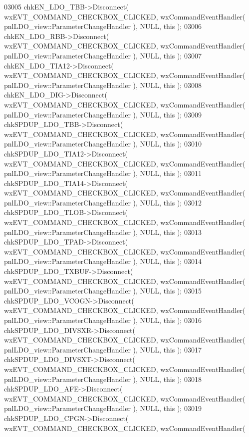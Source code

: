\begin{DoxyCode}
03005     chkEN_LDO_TBB->Disconnect( wxEVT\_COMMAND\_CHECKBOX\_CLICKED, wxCommandEventHandler( 
      pnlLDO_view::ParameterChangeHandler ), NULL, \textcolor{keyword}{this} );
03006     chkEN_LDO_RBB->Disconnect( wxEVT\_COMMAND\_CHECKBOX\_CLICKED, wxCommandEventHandler( 
      pnlLDO_view::ParameterChangeHandler ), NULL, \textcolor{keyword}{this} );
03007     chkEN_LDO_TIA12->Disconnect( wxEVT\_COMMAND\_CHECKBOX\_CLICKED, wxCommandEventHandler( 
      pnlLDO_view::ParameterChangeHandler ), NULL, \textcolor{keyword}{this} );
03008     chkEN_LDO_DIG->Disconnect( wxEVT\_COMMAND\_CHECKBOX\_CLICKED, wxCommandEventHandler( 
      pnlLDO_view::ParameterChangeHandler ), NULL, \textcolor{keyword}{this} );
03009     chkSPDUP_LDO_TBB->Disconnect( wxEVT\_COMMAND\_CHECKBOX\_CLICKED, wxCommandEventHandler( 
      pnlLDO_view::ParameterChangeHandler ), NULL, \textcolor{keyword}{this} );
03010     chkSPDUP_LDO_TIA12->Disconnect( wxEVT\_COMMAND\_CHECKBOX\_CLICKED, wxCommandEventHandler( 
      pnlLDO_view::ParameterChangeHandler ), NULL, \textcolor{keyword}{this} );
03011     chkSPDUP_LDO_TIA14->Disconnect( wxEVT\_COMMAND\_CHECKBOX\_CLICKED, wxCommandEventHandler( 
      pnlLDO_view::ParameterChangeHandler ), NULL, \textcolor{keyword}{this} );
03012     chkSPDUP_LDO_TLOB->Disconnect( wxEVT\_COMMAND\_CHECKBOX\_CLICKED, wxCommandEventHandler( 
      pnlLDO_view::ParameterChangeHandler ), NULL, \textcolor{keyword}{this} );
03013     chkSPDUP_LDO_TPAD->Disconnect( wxEVT\_COMMAND\_CHECKBOX\_CLICKED, wxCommandEventHandler( 
      pnlLDO_view::ParameterChangeHandler ), NULL, \textcolor{keyword}{this} );
03014     chkSPDUP_LDO_TXBUF->Disconnect( wxEVT\_COMMAND\_CHECKBOX\_CLICKED, wxCommandEventHandler( 
      pnlLDO_view::ParameterChangeHandler ), NULL, \textcolor{keyword}{this} );
03015     chkSPDUP_LDO_VCOGN->Disconnect( wxEVT\_COMMAND\_CHECKBOX\_CLICKED, wxCommandEventHandler( 
      pnlLDO_view::ParameterChangeHandler ), NULL, \textcolor{keyword}{this} );
03016     chkSPDUP_LDO_DIVSXR->Disconnect( wxEVT\_COMMAND\_CHECKBOX\_CLICKED, wxCommandEventHandler( 
      pnlLDO_view::ParameterChangeHandler ), NULL, \textcolor{keyword}{this} );
03017     chkSPDUP_LDO_DIVSXT->Disconnect( wxEVT\_COMMAND\_CHECKBOX\_CLICKED, wxCommandEventHandler( 
      pnlLDO_view::ParameterChangeHandler ), NULL, \textcolor{keyword}{this} );
03018     chkSPDUP_LDO_AFE->Disconnect( wxEVT\_COMMAND\_CHECKBOX\_CLICKED, wxCommandEventHandler( 
      pnlLDO_view::ParameterChangeHandler ), NULL, \textcolor{keyword}{this} );
03019     chkSPDUP_LDO_CPGN->Disconnect( wxEVT\_COMMAND\_CHECKBOX\_CLICKED, wxCommandEventHandler( 

\end{DoxyCode}
